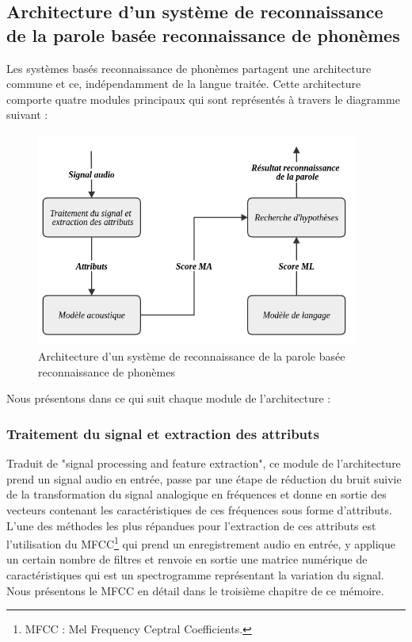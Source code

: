 \subsection{Architecture d'un système de reconnaissance de la parole basée reconnaissance de phonèmes} \label{Archi1}
Les systèmes basés reconnaissance de phonèmes partagent une architecture commune et ce, indépendamment de la langue traitée. Cette architecture comporte quatre modules principaux qui sont représentés à travers le diagramme suivant \cite{deeplearningapproach} :
\begin{figure}[H]
    \centering
    \includegraphics[height=200pt,width=300pt]{images/chap1/architecture_asr.png}
    \caption{Architecture d'un système de reconnaissance de la parole basée reconnaissance de phonèmes}
\end{figure}

Nous présentons dans ce qui suit chaque module de l'architecture :

\subsubsection{Traitement du signal et extraction des attributs}
Traduit de "signal processing and feature extraction", ce module de l'architecture prend un signal audio en entrée, passe par une étape de réduction du bruit suivie de la transformation du signal analogique en fréquences et donne en sortie des vecteurs contenant les caractéristiques de ces fréquences sous forme d'attributs. L'une des méthodes les plus répandues pour l'extraction de ces attributs est l'utilisation du MFCC\footnote{MFCC : Mel Frequency Ceptral Coefficients.} \cite{mfcc} qui prend un enregistrement audio en entrée, y applique un certain nombre de filtres et renvoie en sortie une matrice numérique de caractéristiques qui est un spectrogramme représentant la variation du signal. Nous présentons le MFCC en détail dans le troisième chapitre de ce mémoire.

